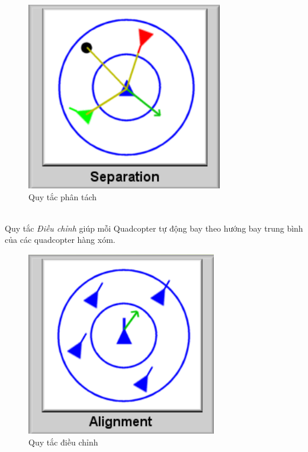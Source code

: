         \begin{figure}[h!]
	        	\begin{center}
	        		\includegraphics[scale=0.4]{images/separation.png}
	        		\caption{Quy tắc phân tách}
	        	\end{center}
        \end{figure}
        \\
        Quy tắc \textit{Điều chỉnh} giúp mỗi Quadcopter tự động bay theo hướng bay trung bình của các quadcopter hàng xóm. 
        \begin{figure}[h!]
	        	\begin{center}
	        		\includegraphics[scale=0.4]{images/alignment.png}
	        		\caption{Quy tắc điều chỉnh}
	        	\end{center}
        \end{figure}
